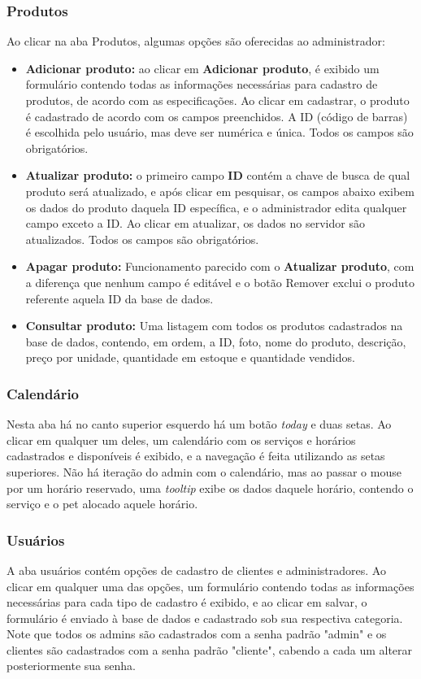 \documentclass[10pt,a4paper]{article}
\begin{document}
\subsubsection{Produtos}
Ao clicar na aba Produtos, algumas opções são oferecidas ao administrador:
\begin{itemize}
\item \textbf{Adicionar produto:} ao clicar em \textbf{Adicionar produto}, é exibido um formulário contendo todas as informações necessárias para cadastro de produtos, de acordo com as especificações. Ao clicar em cadastrar, o produto é cadastrado de acordo com os campos preenchidos. A ID (código de barras) é escolhida pelo usuário, mas deve ser numérica e única. Todos os campos são obrigatórios.
\item \textbf{Atualizar produto:} o primeiro campo \textbf{ID} contém a chave de busca de qual produto será atualizado, e após clicar em pesquisar, os campos abaixo exibem os dados do produto daquela ID específica, e o administrador edita qualquer campo exceto a ID. Ao clicar em atualizar, os dados no servidor são atualizados. Todos os campos são obrigatórios.
\item \textbf{Apagar produto:} Funcionamento parecido com o \textbf{Atualizar produto}, com a diferença que nenhum campo é editável e o botão Remover exclui o produto referente aquela ID da base de dados.
\item \textbf{Consultar produto:} Uma listagem com todos os produtos cadastrados na base de dados, contendo, em ordem, a ID, foto, nome do produto, descrição, preço por unidade, quantidade em estoque e quantidade vendidos.
\end{itemize}
\subsubsection{Calendário}
Nesta aba há no canto superior esquerdo há um botão \textit{today} e duas setas. Ao clicar em qualquer um deles, um calendário com os serviços e horários cadastrados e disponíveis é exibido, e a navegação é feita utilizando as setas superiores. Não há iteração do admin com o calendário, mas ao passar o mouse por um horário reservado, uma \textit{tooltip} exibe os dados daquele horário, contendo o serviço e o pet alocado aquele horário.
\subsubsection{Usuários}
A aba usuários contém opções de cadastro de clientes e administradores. Ao clicar em qualquer uma das opções, um formulário contendo todas as informações necessárias para cada tipo de cadastro é exibido, e ao clicar em salvar, o formulário é enviado à base de dados e cadastrado sob sua respectiva categoria. Note que todos os admins são cadastrados com a senha padrão "admin" e os clientes são cadastrados com a senha padrão "cliente", cabendo a cada um alterar posteriormente sua senha.
\end{document}
